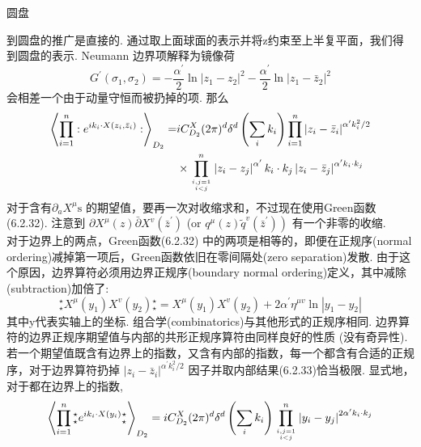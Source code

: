 \centerline{\Large 圆盘}
到圆盘的推广是直接的. 通过取上面球面的表示并将z约束至上半复平面，我们得到圆盘的表示. Neumann 边界项解释为镜像荷
\begin{equation}
	G^{\prime}\left(\sigma_{1}, \sigma_{2}\right)=-\frac{\alpha^{\prime}}{2} \ln \left|z_{1}-z_{2}\right|^{2}-\frac{\alpha^{\prime}}{2} \ln \left|z_{1}-\bar{z}_{2}\right|^{2}
\end{equation}
会相差一个由于动量守恒而被扔掉的项. 那么
\begin{equation}
	\begin{aligned}
		\left\langle\prod_{i=1}^{n}: e^{i k_{i} \cdot X\left(z_{i}, \bar{z}_{i}\right)}:\right\rangle_{D_{2}}=& i C_{D_{2}}^{X}(2 \pi)^{d} \delta^{d}\left(\sum_{i} k_{i}\right) \prod_{i=1}^{n}\left|z_{i}-\bar{z}_{i}\right|^{\alpha^{\prime} k_{i}^{2} / 2} \\
		& \times \prod_{i, j=1 \atop i<j}^{n}\left|z_{i}-z_{j}\right|^{\alpha^{\prime}} k_{i} \cdot k_{j}\left|z_{i}-\bar{z}_{j}\right|^{\alpha^{\prime} k_{i} \cdot k_{j}}
	\end{aligned}
\end{equation}
对于含有$\partial_{a} X^{\mu} \mathrm{s}$ 的期望值，要再一次对收缩求和，不过现在使用Green函数 (6.2.32). 注意到 $\partial X^{\mu}(z) \bar{\partial} X^{v}\left(\bar{z}^{\prime}\right)$ (or $\left.q^{\mu}(z) \tilde{q}^{v}\left(\bar{z}^{\prime}\right)\right)$ 有一个非零的收缩.\\
对于边界上的两点，Green函数(6.2.32) 中的两项是相等的，即便在正规序(normal ordering)减掉第一项后，Green函数依旧在零间隔处(zero separation)发散. 由于这个原因，边界算符必须用边界正规序(boundary normal ordering)定义，其中减除(subtraction)加倍了:
\begin{equation}
	{}_\star^{\star} X^{\mu}\left(y_{1}\right) X^{v}\left(y_{2}\right){}_{\star}^{\star}=X^{\mu}\left(y_{1}\right) X^{v}\left(y_{2}\right)+2 \alpha^{\prime} \eta^{\mu v} \ln \left|y_{1}-y_{2}\right|
\end{equation}
其中y代表实轴上的坐标. 组合学(combinatorics)与其他形式的正规序相同. 边界算符的边界正规序期望值与内部的共形正规序算符由同样良好的性质 (没有奇异性).\\
若一个期望值既含有边界上的指数，又含有内部的指数，每一个都含有合适的正规序，对于边界算符扔掉 $\left|z_{i}-\bar{z}_{i}\right|^{\alpha^{\prime} k_{i}^{2} / 2}$ 因子并取内部结果(6.2.33)恰当极限. 显式地，对于都在边界上的指数,
\begin{equation}
	\left\langle\prod_{i=1}^{n} {}_\star^\star e^{i k_{i} \cdot X\left(y_{i}\right) }{}_\star^\star\right\rangle_{D_{2}}=i C_{D_{2}}^{X}(2 \pi)^{d} \delta^{d}\left(\sum_{i} k_{i}\right) \prod_{i, j=1 \atop i<j}^{n}\left|y_{i}-y_{j}\right|^{2 \alpha^{\prime} k_{i} \cdot k_{j}}
\end{equation}
